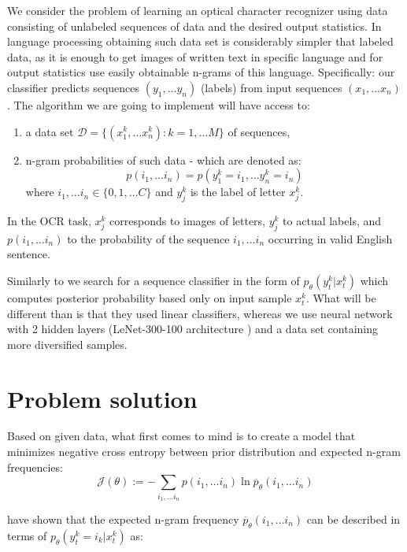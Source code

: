 \documentclass[declaration,shortabstract,lic,english]{iithesis}
\begin{document}
We consider the problem of learning an optical character recognizer using data consisting of unlabeled sequences of data and the desired output statistics. In language processing obtaining such data set is considerably simpler that labeled data, as it is enough to get images of written text in specific language and for output statistics use easily obtainable n-grams of this language. Specifically: our classifier predicts sequences \( (y_1, \dots y_n) \) (labels) from input sequences \( (x_1, \dots x_n) \). The  algorithm we are going to implement will have access to:
\begin{enumerate}
    \item a data set \( \mathcal{D} = \lbrace (x_1^k, \dots x_n^k) : k = 1, \dots M \rbrace \) of sequences,
    \item n-gram probabilities of such data - which are denoted as: 
\[ p(i_1, \dots i_n) = p(y_1^k = i_1, \dots y_n^k = i_n) \]
where \( i_1, \dots i_n \in \lbrace 0, 1, \dots C \rbrace \) and \( y_j^k \) is the label of letter \( x_j^k \).
\end{enumerate}

In the OCR task, $x_j^k$ corresponds to images of letters, $y_j^k$ to actual labels, and $p(i_1, \dots i_n)$ to the probability of the sequence $i_1, \dots i_n$ occurring in valid English sentence.

Similarly to \citet{liu2017unsupervised} we search for a sequence classifier in the form of $p_\theta(y_t^k | x_t^k)$ which computes posterior probability based only on input sample $x_t^k$. What will be different than \citet{liu2017unsupervised} is that they used linear classifiers, whereas we use neural network with 2 hidden layers (\mbox{LeNet-300-100} architecture \citep{lecun1998gradient}) and a data set containing more diversified samples.

\chapter{Problem solution}


Based on given data, what first comes to mind is to create a model that minimizes negative cross entropy between prior distribution and expected n-gram frequencies:
\begin{equation} \label{cross-entropy}
    \mathcal{J}(\theta) := - \sum_{i_1, \dots i_n}p(i_1,\dots i_n) \ln \overline{p}_\theta(i_1, \dots i_n)
\end{equation}

\citet{liu2017unsupervised} have shown that the expected n-gram frequency $\overline{p}_\theta(i_1, \dots i_n)$ can be described in terms of $p_\theta(y_t^k = i_k | x_t^k)$ as:
\end{document}
